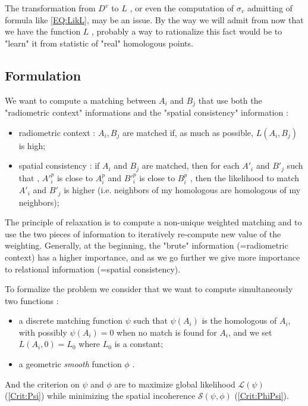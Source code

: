 The transformation from  $D^v$ to $L$  , or even the computation of $\sigma_v$
admitting of formula like \ref{EQ:LikL}, may be an issue. By the way we will admit from
now that we have the function $ L$ , probably a way to rationalize this fact
would be to "learn" it from statistic of "real" homologous points.


\subsection{Formulation}

We want to compute a matching between $A_i$ and $B_j$ that use both the "radiometric context" informations 
and the "spatial consistency" information :

\begin{itemize}
   \item radiometric context : $A_i , B_j$  are matched if, as much as possible, $L(A_i,B_j)$ is high;
   \item spatial consistency : if $A_i$ and $B_j$ are matched, then for each $A'_i$ and $B'_j$ such that ,
         $A'^p_i$ is close to $A^p_i$ and $B'^p_i$ is close to $B^p_i$ , then the likelihood
         to match $A'_i$ and $B'_j$ is higher (i.e. neighbors of my homologous are homologous of
         my neighbors);
\end{itemize}

The principle of relaxation is to compute a non-unique weighted matching and to use
the two pieces of information to iteratively re-compute new value of the weighting. Generally, at
the beginning, the "brute" information (=radiometric context) has a higher importance, and as we go
further we give more importance to relational information (=spatial consistency).

To formalize the problem we consider that we want to compute simultaneously two functions :


\begin{itemize}
   \item a discrete matching function $\psi$  such that $\psi (A_i)$ is the homologous
         of $A_i$, with possibly $\psi (A_i) = 0$  when no match is found for $A_i$,
         and we set  $L(A_i,0) = L_0$ where $L_0$ is a constant;
   \item a geometric \emph{smooth} function $\phi$ .
\end{itemize}

And the criterion on $\psi$ and $\phi$ are to  maximize global
likelihood $\mathcal L(\psi)$ (\ref{Crit:Psi})  while minimizing the
spatial incoherence $ \mathcal S(\psi,\phi)$  (\ref{Crit:PhiPsi}).


